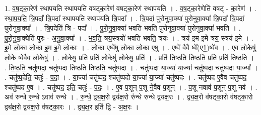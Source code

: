 \documentclass[17pt]{extarticle}
\begin{document}
1. व॒ष॒ट्का॒रेण॑ स्थापयति स्थापयति वषट्का॒रेण॑ वषट्का॒रेण॑ स्थापयति । . व॒ष॒ट्का॒रेणेति॑ वषट् - का॒रेण॑ । . स्था॒प॒य॒ति॒ त्रि॒पदा᳚ त्रि॒पदा᳚ स्थापयति स्थापयति त्रि॒पदा᳚ । . त्रि॒पदा॑ पुरोनुवा॒क्या॑ पुरोनुवा॒क्या᳚ त्रि॒पदा᳚ त्रि॒पदा॑ पुरोनुवा॒क्या᳚ । . त्रि॒पदेति॑ त्रि - पदा᳚ । . पु॒रो॒नु॒वा॒क्या॑ भवति भवति पुरोनुवा॒क्या॑ पुरोनुवा॒क्या॑ भवति । . पु॒रो॒नु॒वा॒क्येति॑ पुरः - अ॒नु॒वा॒क्या᳚ । . भ॒व॒ति॒ त्रय॒स्त्रयो॑ भवति भवति॒ त्रयः॑ । . त्रय॑ इ॒म इ॒मे त्रय॒ स्त्रय॑ इ॒मे । . इ॒मे लो॒का लो॒का इ॒म इ॒मे लो॒काः । . लो॒का ए॒ष्वे॑षु लो॒का लो॒का ए॒षु । . ए॒ष्वे॑ वैवै ष्वे᳚(ए1॒)ष्वे॑व । . ए॒व लो॒केषु॑ लो॒के ष्वे॒वैव लो॒केषु॑ । . लो॒केषु॒ प्रति॒ प्रति॑ लो॒केषु॑ लो॒केषु॒ प्रति॑ । . प्रति॑ तिष्ठति तिष्ठति॒ प्रति॒ प्रति॑ तिष्ठति । . ति॒ष्ठ॒ति॒ चतु॑ष्पदा॒ चतु॑ष्पदा तिष्ठति तिष्ठति॒ चतु॑ष्पदा । . चतु॑ष्पदा या॒ज्या॑ या॒ज्या॑ चतु॑ष्पदा॒ चतु॑ष्पदा या॒ज्या᳚ । . चतु॑ष्प॒देति॒ चतुः॑ - प॒दा॒ । . या॒ज्या॑ चतु॑ष्पद॒ श्चतु॑ष्पदो या॒ज्या॑ या॒ज्या॑ चतु॑ष्पदः । . चतु॑ष्पद ए॒वैव चतु॑ष्पद॒ श्चतु॑ष्पद ए॒व । . चतु॑ष्पद॒ इति॒ चतुः॑ - प॒दः॒ । . ए॒व प॒शून् प॒शू ने॒वैव प॒शून् । . प॒शू नवाव॑ प॒शून् प॒शू नव॑ । . अव॑ रुन्धे रु॒न्धे ऽवाव॑ रुन्धे । . रु॒न्धे॒ द्व्य॒क्ष॒रो द्व्य॑क्ष॒रो रु॑न्धे रुन्धे द्व्यक्ष॒रः । . द्व्य॒क्ष॒रो व॑षट्का॒रो व॑षट्का॒रो द्व्य॑क्ष॒रो द्व्य॑क्ष॒रो व॑षट्का॒रः । . द्व्य॒क्ष॒र इति॑ द्वि - अ॒क्ष॒रः । \newline
\end{document}
